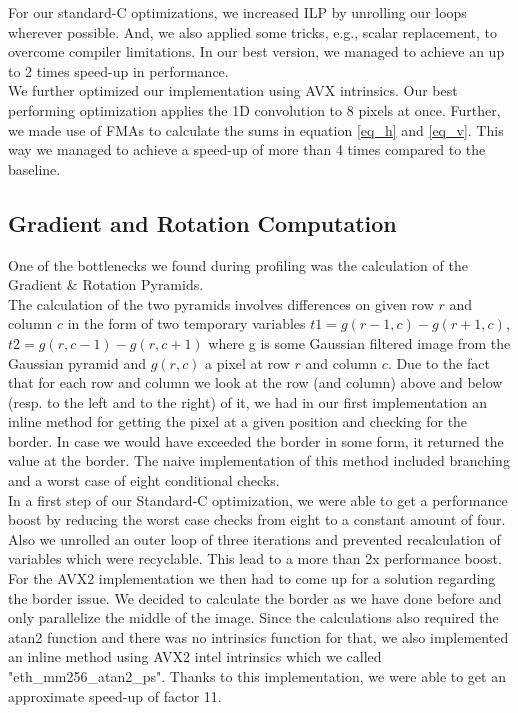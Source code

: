 \documentclass[letterpaper]{article}
\begin{document}
For our standard-C optimizations, we increased ILP by unrolling our loops wherever possible. And, we also applied some tricks, e.g., scalar replacement, to overcome compiler limitations. In our best version, we managed to achieve an up to 2 times speed-up in performance.\\

We further optimized our implementation using AVX intrinsics. Our best performing optimization applies the 1D convolution to 8 pixels at once. Further, we made use of FMAs to calculate the sums in equation \ref{eq_h} and \ref{eq_v}. This way we managed to achieve a speed-up of more than 4 times compared to the baseline.


\subsection*{Gradient and Rotation Computation}
One of the bottlenecks we found during profiling was the calculation of the Gradient \& Rotation Pyramids. \\

The calculation of the two pyramids involves differences on given row $r$ and column $c$ in the form of two temporary variables $t1 = g(r-1,c) - g(r+1, c)$, $t2 = g(r,c-1) - g(r, c+1)$ where g is some Gaussian filtered image from the Gaussian pyramid and $g(r,c)$ a pixel at row $r$ and column $c$.
Due to the fact that for each row and column we look at the row (and column) above and below (resp. to the left and to the right) of it, we had in our first implementation an inline method for getting the pixel at a given position and checking for the border. In case we would have exceeded the border in some form, it returned the value at the border. The naive implementation of this method included branching and a worst case of eight conditional checks. \\

In a first step of our Standard-C optimization, we were able to get a performance boost by reducing the worst case checks from eight to a constant amount of four. Also we unrolled an outer loop of three iterations and prevented recalculation of variables which were recyclable. This lead to a more than 2x performance boost.\\

For the AVX2 implementation we then had to come up for a solution regarding the border issue. We decided to calculate the border as we have done before and only parallelize the middle of the image. Since the calculations also required the atan2 function and there was no intrinsics function for that, we also implemented an inline method using AVX2 intel intrinsics which we called "eth\_mm256\_atan2\_ps". Thanks to this implementation, we were able to get an approximate speed-up of factor 11.
\end{document}
